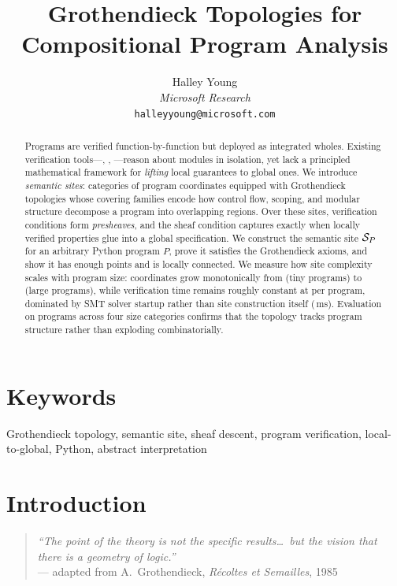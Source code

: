 \documentclass[11pt]{article}
\title{\textbf{Grothendieck Topologies for Compositional Program Analysis}}
\author{%
  Halley Young\\
  \textit{Microsoft Research}\\
  \texttt{halleyyoung@microsoft.com}
}
\date{}
\begin{document}
\maketitle

\begin{abstract}
Programs are verified function-by-function but deployed as integrated wholes.
Existing verification tools---\LEAN, \Fstar, \Dafny---reason about modules in
isolation, yet lack a principled mathematical framework for \emph{lifting} local
guarantees to global ones.  We introduce \emph{semantic sites}: categories of
program coordinates equipped with Grothendieck topologies whose covering
families encode how control flow, scoping, and modular structure decompose a
program into overlapping regions.  Over these sites, verification conditions form
\emph{presheaves}, and the sheaf condition captures exactly when locally verified
properties glue into a global specification.  We construct the semantic site
$\mathcal{S}_P$ for an arbitrary Python program $P$, prove it satisfies the
Grothendieck axioms, and show it has enough points and is locally connected.
We measure how site complexity scales with program size: coordinates
grow monotonically from \compTinyMeanCoords{} (tiny programs) to
\compLargeMeanCoords{} (large programs), while verification time
remains roughly constant at \compTimeMean{} per program, dominated by
SMT solver startup rather than site construction itself
(\compSiteMeanBuildMs\,ms).  Evaluation on \compTotalPrograms{}
programs across four size categories confirms that the topology tracks
program structure rather than exploding combinatorially.
\end{abstract}

\section*{Keywords}
Grothendieck topology, semantic site, sheaf descent, program verification,
local-to-global, Python, abstract interpretation

\section{Introduction}\label{sec:intro}

\begin{quote}
\emph{``The point of the theory is not the specific
results\ldots\ but the vision that there is a geometry
of logic.''}\\
\mbox{}\hfill --- adapted from A.~Grothendieck, \emph{R\'ecoltes et
Semailles}, 1985
\end{quote}
\end{document}
